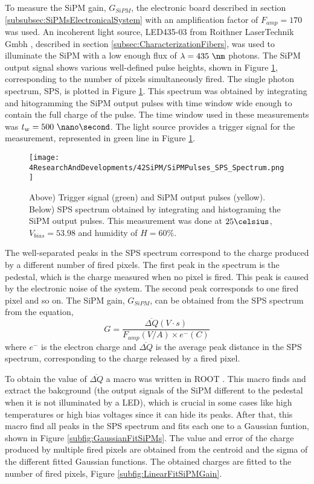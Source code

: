 To measure the SiPM gain, $G_{SiPM}$, the electronic board described in section \ref{subsubsec:SiPMsElectronicalSystem} with an amplification factor of $F_{amp}=170$ was used. An incoherent light source, LED435-03 from Roithner LaserTechnik Gmbh \cite{LEDRLT}, described in section \ref{subsec:CharacterizationFibers}, was used to illuminate the SiPM with a low enough flux of $\lambda= 435~\nm$ photons. The SiPM output signal shows various well-defined pulse heights, shown in Figure \ref{fig:OutputPulses_SPSspectrum}, corresponding to the number of pixels simultaneously fired. The single photon spectrum, SPS, is plotted in Figure \ref{fig:OutputPulses_SPSspectrum}. This spectrum was obtained by integrating and hitogramming the SiPM output pulses with time window wide enough to contain the full charge of the pulse. The time window used in these measurements was $t_w= 500~\nano\second$. The light source provides a trigger signal for the measurement, represented in green line in Figure \ref{fig:OutputPulses_SPSspectrum}.

\begin{figure}[hbtp]
\centering
\texttt{[image: 4ResearchAndDevelopments/42SiPM/SiPMPulses\_SPS\_Spectrum.png]}
\caption{Above) Trigger signal (green) and SiPM output pulses (yellow). Below) SPS spectrum obtained by integrating and histograming the SiPM output pulses. This measurement was done at $25\celsius$, $V_{bias}=53.98$ and humidity of $H=60\%$. \label{fig:OutputPulses_SPSspectrum}}
\end{figure}

The well-separated peaks in the SPS spectrum correspond to the charge produced by a different number of fired pixels. The first peak in the spectrum is the pedestal, which is the charge measured when no pixel is fired. This peak is caused by the electronic noise of the system. The second peak corresponds to one fired pixel and so on. The SiPM gain, $G_{SiPM}$, can be obtained from the SPS spectrum from the equation,
\begin{equation}
G=\frac{\overline{\Delta Q}(V \cdot{} s)}{F_{amp}(V/A) \times e^-(C)}
\label{SiPMGain}
\end{equation}
where $e^-$ is the electron charge and $\overline{\Delta Q}$ is the average peak distance in the SPS spectrum, corresponding to the charge released by a fired pixel. 

To obtain the value of $\overline{\Delta Q}$ a macro was written in ROOT \cite{ROOTWebPage}. This macro finds and extract the bakcground (the output signals of the SiPM different to the pedestal when it is not illuminated by a LED), which is crucial in some cases like high temperatures or high bias voltages since it can hide its peaks. After that, this macro find all peaks in the SPS spectrum and fits each one to a Gaussian funtion, shown in Figure \ref{subfig:GaussianFitSiPMs}. The value and error of the charge produced by multiple fired pixels are obtained from the centroid and the sigma of the different fitted Gaussian functions. The obtained charges are fitted to the number of fired pixels, Figure \ref{subfig:LinearFitSiPMGain}.

